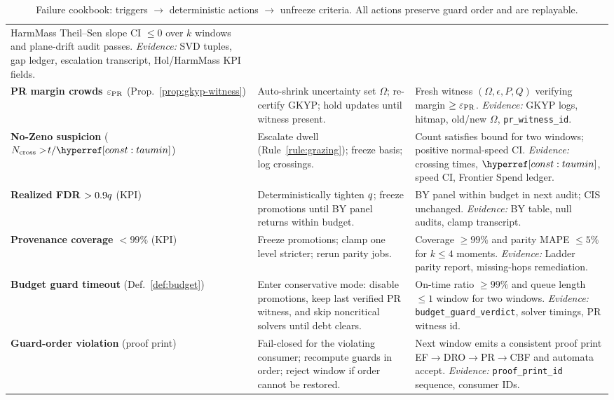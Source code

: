 \begin{table}[t]
\begin{tabularx}{\textwidth}{@{}>{\raggedright\arraybackslash}p{3.0cm} >{\raggedright\arraybackslash}p{4.2cm} >{\raggedright\arraybackslash}X@{}}
HarmMass Theil–Sen slope CI $\le 0$ over $k$ windows and plane-drift audit passes. \textit{Evidence:} SVD tuples, gap ledger, escalation transcript, Hol/HarmMass KPI fields. \\ \addlinespace
\textbf{PR margin crowds $\varepsilon_{\mathrm{PR}}$} (Prop.~\ref{prop:gkyp-witness}) &
Auto-shrink uncertainty set $\Omega$; re-certify GKYP; hold updates until witness present. &
Fresh witness $(\Omega,\epsilon,P,Q)$ verifying margin $\ge \varepsilon_{\mathrm{PR}}$. \textit{Evidence:} GKYP logs, hitmap, old/new $\Omega$, \texttt{pr\_witness\_id}. \\ \addlinespace
\textbf{No-Zeno suspicion} ($N_{\mathrm{cross}}>\!t/\constref{taumin}$) &
Escalate dwell (Rule~\ref{rule:grazing}); freeze basis; log crossings. &
Count satisfies bound for two windows; positive normal-speed CI. \textit{Evidence:} crossing times, $\constref{taumin}$, speed CI, Frontier Spend ledger. \\ \addlinespace
\textbf{Realized FDR $>0.9q$} (KPI) &
Deterministically tighten $q$; freeze promotions until BY panel returns within budget. &
BY panel within budget in next audit; CIS unchanged. \textit{Evidence:} BY table, null audits, clamp transcript. \\ \addlinespace
\textbf{Provenance coverage $<99\%$} (KPI) &
Freeze promotions; clamp one level stricter; rerun parity jobs. &
Coverage $\ge99\%$ and parity MAPE $\le5\%$ for $k\le4$ moments. \textit{Evidence:} Ladder parity report, missing-hops remediation. \\ \addlinespace
\textbf{Budget guard timeout} (Def.~\ref{def:budget}) &
Enter conservative mode: disable promotions, keep last verified PR witness, and skip noncritical solvers until debt clears. &
On-time ratio $\ge 99\%$ and queue length $\le 1$ window for two windows. \textit{Evidence:} \texttt{budget\_guard\_verdict}, solver timings, PR witness id. \\ \addlinespace
\textbf{Guard-order violation} (proof print) &
Fail-closed for the violating consumer; recompute guards in order; reject window if order cannot be restored. &
Next window emits a consistent proof print EF$\rightarrow$DRO$\rightarrow$PR$\rightarrow$CBF and automata accept. \textit{Evidence:} \texttt{proof\_print\_id} sequence, consumer IDs. \\
\bottomrule
\end{tabularx}
\caption{Failure cookbook: triggers $\rightarrow$ deterministic actions $\rightarrow$ unfreeze criteria. All actions preserve guard order and are replayable.}
\label{tab:fail-cookbook}
\end{table}

